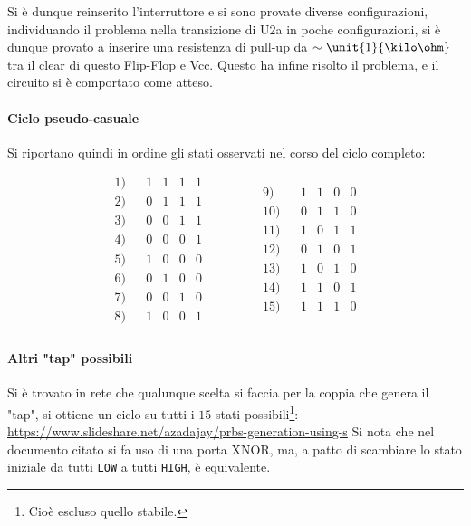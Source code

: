 \documentclass[a4paper,10pt]{article}
\def\code#1{\texttt{#1}}
\begin{document}
Si è dunque reinserito l'interruttore e si sono provate diverse configurazioni, individuando il problema nella transizione di U$2$a in poche configurazioni, si è dunque provato a inserire una resistenza di pull-up da $\sim \unit{1}{\kilo\ohm}$ tra il clear di questo Flip-Flop e Vcc. 
Questo ha infine risolto il problema, e il circuito si è comportato come atteso.

\paragraph{Ciclo pseudo-casuale} Si riportano quindi in ordine gli stati osservati nel corso del ciclo completo:

\begin{equation*}
\begin{matrix}
1)	&		&	1	&	1	&	1	&	1	\\
2)	&		&	0	&	1	&	1	&	1	\\
3)	&		&	0	&	0	&	1	&	1	\\
4)	&		&	0	&	0	&	0	&	1	\\
5)	&		&	1	&	0	&	0	&	0	\\
6)	&		&	0	&	1	&	0	&	0	\\
7)	&		&	0	&	0	&	1	&	0	\\
8)	&		&	1	&	0	&	0	&	1	\\
\end{matrix}
\qquad \qquad
\begin{matrix}
9)	&		&	1	&	1	&	0	&	0	\\
10)	&		&	0	&	1	&	1	&	0	\\
11)	&		&	1	&	0	&	1	&	1	\\
12)	&		&	0	&	1	&	0	&	1	\\
13)	&		&	1	&	0	&	1	&	0	\\
14)	&		&	1	&	1	&	0	&	1	\\
15)	&		&	1	&	1	&	1	&	0	\\
\end{matrix}
\end{equation*}

\paragraph{Altri "tap" possibili} Si è trovato in rete che qualunque scelta si faccia per la coppia che genera il "tap", si ottiene un ciclo su tutti i $15$ stati possibili\footnote{Cioè escluso quello stabile.}:
\newline
\newline
\href{https://www.slideshare.net/azadajay/prbs-generation-using-s}{https://www.slideshare.net/azadajay/prbs-generation-using-s}
\newline
\newline
Si nota che nel documento citato si fa uso di una porta XNOR, ma, a patto di scambiare lo stato iniziale da tutti \code{LOW} a tutti \code{HIGH}, è equivalente.
\end{document}
